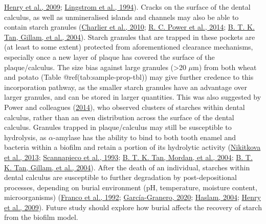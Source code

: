 \documentclass[
  letterpaper,
]{book}
\begin{document}
\protect\hyperlink{ref-henryCookingStarch2009}{Henry et al., 2009};
\protect\hyperlink{ref-lingstromStarchyFood1994}{Lingstrom et al.,
1994}). Cracks on the surface of the dental calculus, as well as
unmineralised islands and channels may also be able to contain starch
granules (\protect\hyperlink{ref-charlierSEMCalculus2010}{Charlier et
al., 2010}; \protect\hyperlink{ref-powerSEMCalculus2014}{R. C. Power et
al., 2014}; \protect\hyperlink{ref-tanCalculusUltrastructure2004}{B. T.
K. Tan, Gillam, et al., 2004}). Starch granules that are trapped in
these pockets are (at least to some extent) protected from
aforementioned clearance mechanisms, especially once a new layer of
plaque has covered the surface of the plaque/calculus. The size bias
against large granules (\textgreater20 \(\mu\)m) from both wheat and
potato (Table @ref(tab:sample-prop-tbl)) may give further credence to
this incorporation pathway, as the smaller starch granules have an
advantage over larger granules, and can be stored in larger quantities.
This was also suggested by Power and colleagues
(\protect\hyperlink{ref-powerSEMCalculus2014}{2014}), who observed
clusters of starches within dental calculus, rather than an even
distribution across the surface of the dental calculus. Granules trapped
in plaque/calculus may still be susceptible to hydrolysis, as
\(\alpha\)-amylase has the ability to bind to both tooth enamel and
bacteria within a biofilm and retain a portion of its hydrolytic
activity (\protect\hyperlink{ref-nikitkovaStarchBiofilms2013}{Nikitkova
et al., 2013};
\protect\hyperlink{ref-scannapiecoSalivaryAmylase1993}{Scannapieco et
al., 1993}; \protect\hyperlink{ref-tanBacterialViability2004}{B. T. K.
Tan, Mordan, et al., 2004};
\protect\hyperlink{ref-tanCalculusUltrastructure2004}{B. T. K. Tan,
Gillam, et al., 2004}). After the death of an individual, starches
within dental calculus are susceptible to further degradation by
post-depositional processes, depending on burial environment (pH,
temperature, moisture content, microorganisms)
(\protect\hyperlink{ref-francoStarchDegradation1992}{Franco et al.,
1992};
\protect\hyperlink{ref-graneroStarchTaphonomy2020}{García-Granero,
2020}; \protect\hyperlink{ref-haslamDecompositionStarch2004}{Haslam,
2004}; \protect\hyperlink{ref-henryCookingStarch2009}{Henry et al.,
2009}). Future study should explore how burial affects the recovery of
starch from the biofilm model.
\end{document}
